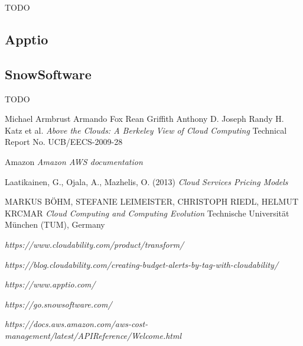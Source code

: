 \documentclass[licencjacka,en]{thesisclass}
\begin{document}
	TODO

	\subsection{Apptio}

	\subsection{SnowSoftware}

	TODO


    
\begin{thebibliography}{99}

    Michael Armbrust Armando Fox Rean Griffith Anthony D. Joseph Randy H. Katz et al.
    \textit{Above the Clouds: A Berkeley View of Cloud Computing} 
    Technical Report No. UCB/EECS-2009-28

    Amazon
    \textit{Amazon AWS documentation} 
        
    Laatikainen, G., Ojala, A., Mazhelis, O. (2013)
    \textit{Cloud Services Pricing Models}

    MARKUS BÖHM, STEFANIE LEIMEISTER, CHRISTOPH RIEDL, HELMUT KRCMAR
    \textit{Cloud Computing and Computing Evolution}
    Technische Universität München (TUM), Germany

    \textit{https://www.cloudability.com/product/transform/}

    \textit{https://blog.cloudability.com/creating-budget-alerts-by-tag-with-cloudability/}

    \textit{https://www.apptio.com/}

    \textit{https://go.snowsoftware.com/}

    \textit{https://docs.aws.amazon.com/aws-cost-management/latest/APIReference/Welcome.html}

\end{thebibliography}
\end{document}
